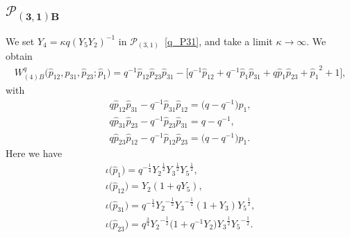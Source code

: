 \documentclass[pdftex]{sigma}
\numberwithin{equation}{section}
\begin{document}
\subsection[$\mathcal{P}_{(3,1)B}$]{$\boldsymbol{\mathcal{P}_{(3,1)B}}$}
We set $Y_4 = \kappa q( Y_5 Y_2)^{-1}$ in $\mathcal{P}_{(3,1)}$~\eqref{q_P31}, and take a limit $\kappa\to\infty$. We obtain
\begin{gather*}
 W^q_{(4)B}\big( \hat{p}_{12}, \hat{p}_{31}, \hat{p}_{23}; \hat{p}_1 \big) = q^{-1} \hat{p}_{12} \hat{p}_{23} \hat{p}_{31} -\big[ q^{-1} \hat{p}_{12} + q^{-1} \hat{p}_1 \hat{p}_{31} + q \hat{p}_1 \hat{p}_{23}
 + {\hat{p}_1}^{2} + 1\big],
\end{gather*}
with
\begin{gather*}
 q \hat{p}_{12} \hat{p}_{31} - q^{-1} \hat{p}_{31} \hat{p}_{12} =\big( q - q^{-1}\big) \hat{p}_1 , \\
 q \hat{p}_{31} \hat{p}_{23} - q^{-1} \hat{p}_{23} \hat{p}_{31} = q - q^{-1} , \\
 q \hat{p}_{23} \hat{p}_{12} - q^{-1} \hat{p}_{12} \hat{p}_{23} =\big( q - q^{-1}\big) \hat{p}_1 .
\end{gather*}
Here we have
\begin{gather*}
 \iota\big(\hat{p}_1\big)= q^{-\frac{1}{4}} {Y_2}^{\frac{1}{2}} {Y_3}^{\frac{1}{2}} {Y_5}^{\frac{1}{2}} , \\
 \iota\big(\hat{p}_{12}\big) = {Y_2} ( 1 + q Y_5 ) , \\
 \iota\big(\hat{p}_{31}\big) = q^{-\frac{1}{4}} {Y_2}^{-\frac{1}{2}} {Y_3}^{-\frac{1}{2}}( 1 + {Y_3}) {Y_5}^{\frac{1}{2}} , \\
 \iota\big(\hat{p}_{23}\big) = q^{\frac{3}{4}} {Y_2}^{-\frac{1}{2}} \big( 1 + q^{-1} {Y_2} \big) {Y_3}^{\frac{1}{2}} {Y_5}^{-\frac{1}{2}}.
\end{gather*}
\end{document}
